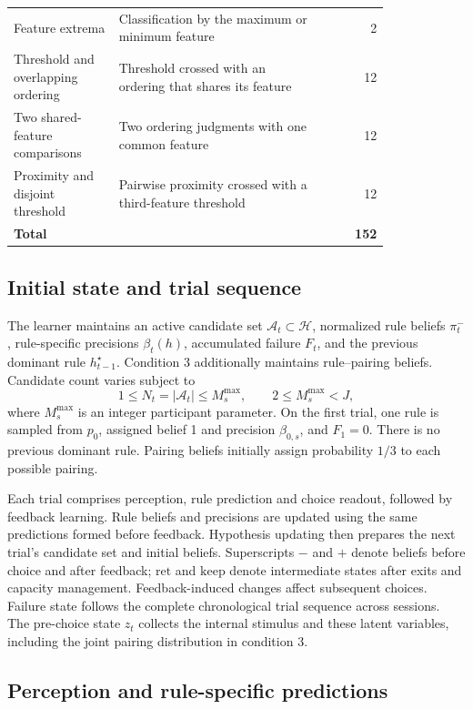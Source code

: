 {\begin{longtable}{>{\raggedright\arraybackslash}p{0.28\linewidth}>{\raggedright\arraybackslash}p{0.54\linewidth}r}
Feature extrema & Classification by the maximum or minimum feature & 2\\
Threshold and overlapping ordering & Threshold crossed with an ordering that shares its feature & 12\\
Two shared-feature comparisons & Two ordering judgments with one common feature & 12\\
Proximity and disjoint threshold & Pairwise proximity crossed with a third-feature threshold & 12\\
\textbf{Total} & & \textbf{152}\\
\bottomrule
\end{longtable}
}

\subsection*{Initial state and trial sequence}
\label{m:state}

The learner maintains an active candidate set $\mathcal A_t\subset\mathcal H$, normalized rule beliefs $\pi_t^-$, rule-specific precisions $\beta_t(h)$, accumulated failure $F_t$, and the previous dominant rule $h_{t-1}^{\star}$. Condition 3 additionally maintains rule--pairing beliefs. Candidate count varies subject to
\begin{equation}
1\leq N_t=|\mathcal A_t|\leq M_s^{\max},\qquad
2\leq M_s^{\max}<J,
\label{eq:capacity-bound}
\end{equation}
where $M_s^{\max}$ is an integer participant parameter. On the first trial, one rule is sampled from $p_0$, assigned belief 1 and precision $\beta_{0,s}$, and $F_1=0$. There is no previous dominant rule. Pairing beliefs initially assign probability $1/3$ to each possible pairing.

Each trial comprises perception, rule prediction and choice readout, followed by feedback learning. Rule beliefs and precisions are updated using the same predictions formed before feedback. Hypothesis updating then prepares the next trial's candidate set and initial beliefs. Superscripts $-$ and $+$ denote beliefs before choice and after feedback; $\mathrm{ret}$ and $\mathrm{keep}$ denote intermediate states after exits and capacity management. Feedback-induced changes affect subsequent choices. Failure state follows the complete chronological trial sequence across sessions. The pre-choice state $z_t$ collects the internal stimulus and these latent variables, including the joint pairing distribution in condition 3.

\subsection*{Perception and rule-specific predictions}
\label{m:perception}

